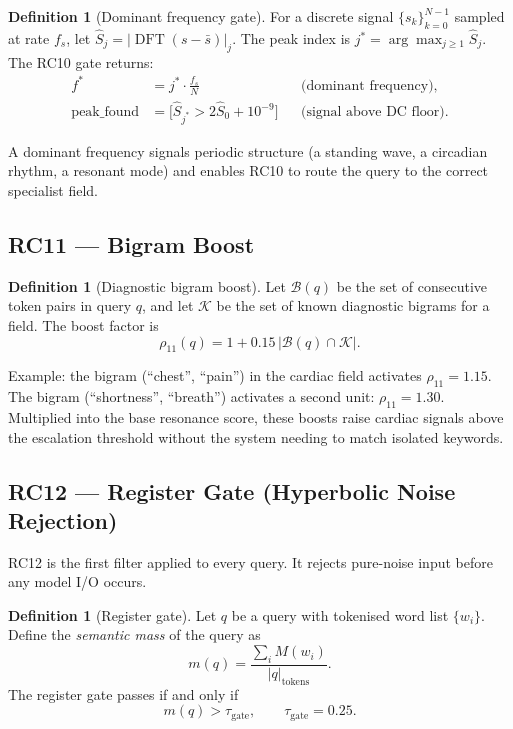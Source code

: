 \documentclass[12pt,a4paper]{article}
\theoremstyle{plain}
\theoremstyle{definition}
\newtheorem{definition}[theorem]{Definition}
\theoremstyle{remark}
\begin{document}
\begin{definition}[Dominant frequency gate]
For a discrete signal $\{s_k\}_{k=0}^{N-1}$ sampled at rate $f_s$,
let $\hat S_j = \bigl|\operatorname{DFT}(s - \bar s)\bigr|_j$.
The peak index is $j^* = \arg\max_{j\geq 1} \hat S_j$.
The RC10 gate returns:
\begin{align}
f^* &= j^* \cdot \frac{f_s}{N}
    && \text{(dominant frequency)}, \\
\text{peak\_found} &= \bigl[\hat S_{j^*} > 2\hat S_0 + 10^{-9}\bigr]
    && \text{(signal above DC floor)}.
\end{align}
\end{definition}

A dominant frequency signals periodic structure (a standing wave, a
circadian rhythm, a resonant mode) and enables RC10 to route
the query to the correct specialist field.

\subsection{RC11 --- Bigram Boost}
\label{sec:rc11}

\begin{definition}[Diagnostic bigram boost]
Let $\mathcal{B}(q)$ be the set of consecutive token pairs in query $q$,
and let $\mathcal{K}$ be the set of known diagnostic bigrams for a
field.  The boost factor is
\begin{equation}
\rho_{11}(q) = 1 + 0.15 \,\bigl|\mathcal{B}(q) \cap \mathcal{K}\bigr|.
\label{eq:rc11}
\end{equation}
\end{definition}

Example: the bigram (``chest'', ``pain'') in the cardiac field activates
$\rho_{11} = 1.15$.  The bigram (``shortness'', ``breath'') activates a
second unit: $\rho_{11} = 1.30$.  Multiplied into the base resonance
score, these boosts raise cardiac signals above the escalation threshold
without the system needing to match isolated keywords.

\subsection{RC12 --- Register Gate (Hyperbolic Noise Rejection)}
\label{sec:rc12}

RC12 is the first filter applied to every query.  It rejects
pure-noise input before any model I/O occurs.

\begin{definition}[Register gate]
Let $q$ be a query with tokenised word list $\{w_i\}$.
Define the \emph{semantic mass} of the query as
\begin{equation}
m(q) = \frac{\sum_i M(w_i)}{|q|_{\text{tokens}}}.
\end{equation}
The register gate passes if and only if
\begin{equation}
m(q) > \tau_{\text{gate}},
\qquad \tau_{\text{gate}} = 0.25.
\label{eq:rc12}
\end{equation}
\end{definition}
\end{document}
